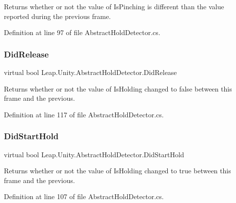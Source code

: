 Returns whether or not the value of Is\+Pinching is different than the value reported during the previous frame. 



Definition at line 97 of file Abstract\+Hold\+Detector.\+cs.

\mbox{\label{class_leap_1_1_unity_1_1_abstract_hold_detector_af7297ca8cb27686b12bef6632865a462}} 
\subsubsection{\texorpdfstring{DidRelease}{DidRelease}}
{\footnotesize\ttfamily virtual bool Leap.\+Unity.\+Abstract\+Hold\+Detector.\+Did\+Release\hspace{0.3cm}{\ttfamily [get]}}



Returns whether or not the value of Is\+Holding changed to false between this frame and the previous. 



Definition at line 117 of file Abstract\+Hold\+Detector.\+cs.

\mbox{\label{class_leap_1_1_unity_1_1_abstract_hold_detector_abfd4857ecfa5343c3567ac14323f405c}} 
\subsubsection{\texorpdfstring{DidStartHold}{DidStartHold}}
{\footnotesize\ttfamily virtual bool Leap.\+Unity.\+Abstract\+Hold\+Detector.\+Did\+Start\+Hold\hspace{0.3cm}{\ttfamily [get]}}



Returns whether or not the value of Is\+Holding changed to true between this frame and the previous. 



Definition at line 107 of file Abstract\+Hold\+Detector.\+cs.

\mbox{\label{class_leap_1_1_unity_1_1_abstract_hold_detector_a848f884394e70077b29151eb0990a01f}} 
